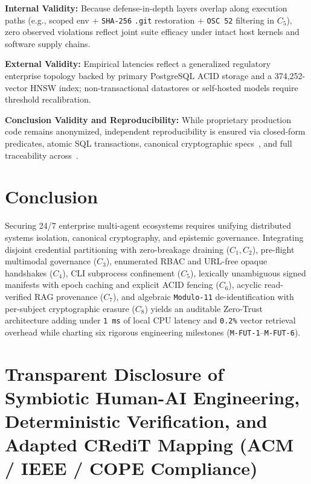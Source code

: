 \documentclass[10pt,twocolumn]{article}
\begin{document}
\textbf{Internal Validity:} Because defense-in-depth layers overlap along execution paths (e.g., scoped env + \texttt{SHA-256} \texttt{.git} restoration + \texttt{OSC 52} filtering in $C_5$), zero observed violations reflect joint suite efficacy under intact host kernels and software supply chains.

\textbf{External Validity:} Empirical latencies reflect a generalized regulatory enterprise topology backed by primary PostgreSQL ACID storage and a 374,252-vector HNSW index; non-transactional datastores or self-hosted models require threshold recalibration.

\textbf{Conclusion Validity and Reproducibility:} While proprietary production code remains anonymized, independent reproducibility is ensured via closed-form predicates, atomic SQL transactions, canonical cryptographic specs~\cite{R09,R11,R17}, and full traceability across~\cite{R01,R02,R03,R04,R05,R06,R07,R08,R09,R10,R11,R12,R13,R14,R15,R16,R17,R18,R19,R20,R21,R22,R23,R24,R25,R26,R27,R28,R29}.

\section{Conclusion}

Securing 24/7 enterprise multi-agent ecosystems requires unifying distributed systems isolation, canonical cryptography, and epistemic governance. Integrating disjoint credential partitioning with zero-breakage draining ($C_1, C_2$), pre-flight multimodal governance ($C_3$), enumerated RBAC and URL-free opaque handshakes ($C_4$), CLI subprocess confinement ($C_5$), lexically unambiguous signed manifests with epoch caching and explicit ACID fencing ($C_6$), acyclic read-verified RAG provenance ($C_7$), and algebraic \texttt{Modulo-11} de-identification with per-subject cryptographic erasure ($C_8$) yields an auditable Zero-Trust architecture adding under \texttt{1 ms} of local CPU latency and \texttt{0.2\%} vector retrieval overhead while charting six rigorous engineering milestones (\texttt{M-FUT-1}--\texttt{M-FUT-6}).

\section*{Transparent Disclosure of Symbiotic Human-AI Engineering, Deterministic Verification, and Adapted CRediT Mapping (ACM / IEEE / COPE Compliance)}
\end{document}
